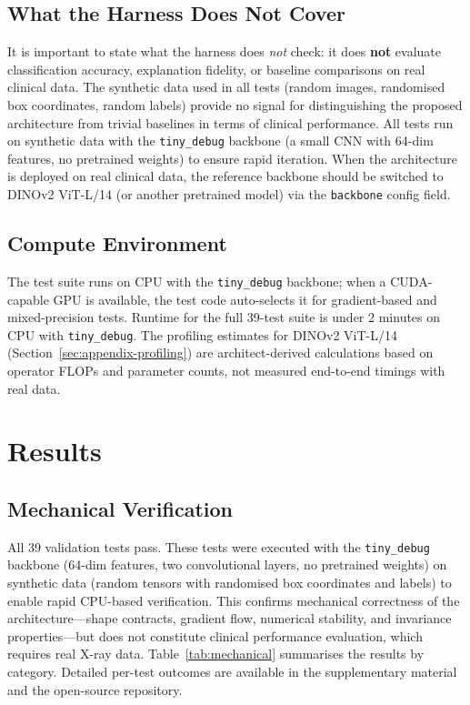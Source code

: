 \documentclass{article}
\begin{document}
\subsection{What the Harness Does Not Cover}
It is important to state what the harness does \emph{not} check: it does \textbf{not} evaluate classification accuracy, explanation fidelity, or baseline comparisons on real clinical data. The synthetic data used in all tests (random images, randomised box coordinates, random labels) provide no signal for distinguishing the proposed architecture from trivial baselines in terms of clinical performance. All tests run on synthetic data with the \texttt{tiny\_debug} backbone (a small CNN with 64-dim features, no pretrained weights) to ensure rapid iteration. When the architecture is deployed on real clinical data, the reference backbone should be switched to DINOv2 ViT-L/14 (or another pretrained model) via the \texttt{backbone} config field.

\subsection{Compute Environment}
The test suite runs on CPU with the \texttt{tiny\_debug} backbone; when a CUDA-capable GPU is available, the test code auto-selects it for gradient-based and mixed-precision tests. Runtime for the full 39-test suite is under 2 minutes on CPU with \texttt{tiny\_debug}. The profiling estimates for DINOv2 ViT-L/14 (Section~\ref{sec:appendix-profiling}) are architect-derived calculations based on operator FLOPs and parameter counts, not measured end-to-end timings with real data.

\section{Results}
\label{sec:results}

\subsection{Mechanical Verification}

All 39 validation tests pass. These tests were executed with the \texttt{tiny\_debug} backbone (64-dim features, two convolutional layers, no pretrained weights) on synthetic data (random tensors with randomised box coordinates and labels) to enable rapid CPU-based verification. This confirms mechanical correctness of the architecture---shape contracts, gradient flow, numerical stability, and invariance properties---but does not constitute clinical performance evaluation, which requires real X-ray data. Table~\ref{tab:mechanical} summarises the results by category. Detailed per-test outcomes are available in the supplementary material and the open-source repository.
\end{document}
